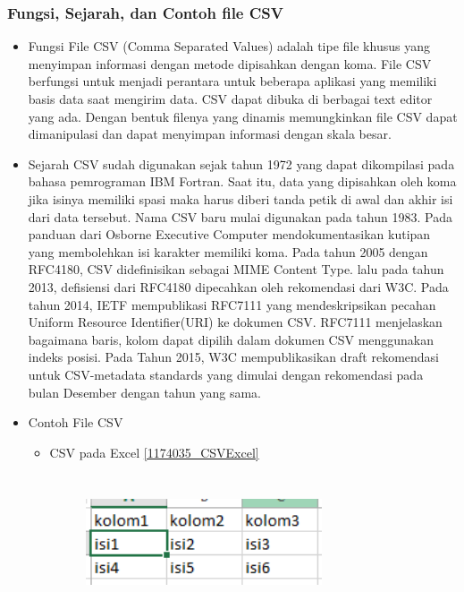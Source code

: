 \subsubsection{Fungsi, Sejarah, dan Contoh file CSV}
\begin{itemize}
	\item Fungsi \linebreak File CSV (Comma Separated Values) adalah tipe file khusus yang menyimpan informasi dengan metode dipisahkan dengan koma. File CSV berfungsi untuk menjadi perantara untuk beberapa aplikasi yang memiliki basis data saat mengirim data. CSV dapat dibuka di berbagai text editor
	yang ada. Dengan bentuk filenya yang dinamis memungkinkan file CSV dapat dimanipulasi dan dapat menyimpan informasi dengan skala besar.
	\item Sejarah \linebreak CSV sudah digunakan sejak tahun 1972 yang dapat dikompilasi pada bahasa pemrograman IBM Fortran. Saat itu, data yang dipisahkan oleh koma jika isinya memiliki spasi maka harus diberi tanda petik di awal dan akhir isi dari data tersebut. Nama CSV baru mulai digunakan pada tahun 1983. Pada panduan dari Osborne Executive Computer mendokumentasikan kutipan yang membolehkan isi karakter memiliki koma.  Pada tahun 2005 dengan RFC4180, CSV didefinisikan sebagai MIME Content Type. lalu pada tahun 2013, defisiensi dari RFC4180 dipecahkan oleh rekomendasi dari W3C. Pada tahun 2014, IETF mempublikasi RFC7111 yang mendeskripsikan pecahan Uniform Resource Identifier(URI) ke dokumen CSV. RFC7111 menjelaskan bagaimana baris, kolom dapat dipilih dalam dokumen CSV menggunakan indeks posisi. Pada Tahun 2015, W3C mempublikasikan draft rekomendasi untuk CSV-metadata standards yang dimulai dengan rekomendasi pada bulan Desember dengan tahun yang sama. 
	\item Contoh File CSV \begin{itemize}
							\item 
							CSV pada Excel \ref{1174035_CSVExcel}
							\begin{figure}[!htbp]
								\centering
								\includegraphics[height=4cm, width=7cm]{figures/chapter4/1174035_CSVExcel.jpg}

\end{figure}
\end{itemize}
\end{itemize}
